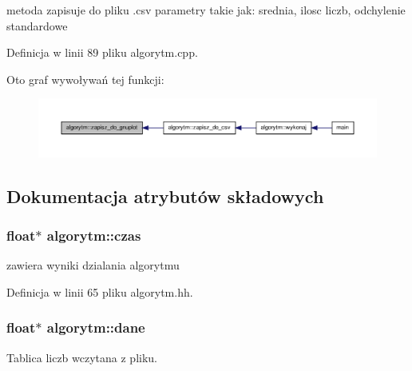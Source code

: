 metoda zapisuje do pliku .csv parametry takie jak\-: srednia, ilosc liczb, odchylenie standardowe 



\-Definicja w linii 89 pliku algorytm.\-cpp.



\-Oto graf wywoływań tej funkcji\-:\nopagebreak
\begin{figure}[H]
\begin{center}
\leavevmode
\includegraphics[width=350pt]{classalgorytm_ad2051f4366b78a7c73adc8b3418a495c_icgraph}
\end{center}
\end{figure}




\subsection{\-Dokumentacja atrybutów składowych}
\hypertarget{classalgorytm_a8005d5f3266848b756400e3bb189de58}{
\subsubsection[{czas}]{\setlength{\rightskip}{0pt plus 5cm}float$\ast$ {\bf algorytm\-::czas}}}\label{classalgorytm_a8005d5f3266848b756400e3bb189de58}


zawiera wyniki dzialania algorytmu 



\-Definicja w linii 65 pliku algorytm.\-hh.

\hypertarget{classalgorytm_a5dd6d510b611002cfb9737f12eeff63f}{
\subsubsection[{dane}]{\setlength{\rightskip}{0pt plus 5cm}float$\ast$ {\bf algorytm\-::dane}}}\label{classalgorytm_a5dd6d510b611002cfb9737f12eeff63f}


\-Tablica liczb wczytana z pliku. 



